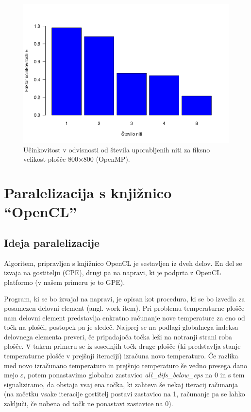 \documentclass[a4paper,titlepage,11pt]{article}
\begin{document}
\begin{figure}[H]
\begin{center}
\includegraphics[scale=0.55]{graf-rezultati-3_3.png}
\caption{Učinkovitost v odvisnosti od števila uporabljenih niti za fiksno velikost plošče 800$\times$800 (OpenMP).}
\label{graf-rezultati-ucinkovitost-3}
\end{center}
\vspace{-25pt}
\end{figure}

\pagebreak

\section{Paralelizacija s knjižnico ``OpenCL''}
\label{poglavje-opencl}

\subsection{Ideja paralelizacije}

Algoritem, pripravljen s knjižnico OpenCL je sestavljen iz dveh delov. En del se izvaja na gostitelju (CPE), drugi pa na napravi, ki je podprta z OpenCL platformo (v našem primeru je to GPE).

Program, ki se bo izvajal na napravi, je opisan kot procedura, ki se bo izvedla za posamezen delovni element (angl. work-item). Pri problemu temperaturne plošče nam delovni element predstavlja enkratno računanje nove temperature za eno od točk na plošči, postopek pa je sledeč. Najprej se na podlagi globalnega indeksa delovnega elementa preveri, če pripadajoča točka leži na notranji strani roba plošče. V takem primeru se iz sosednjih točk druge plošče (ki predstavlja stanje temperaturne plošče v prejšnji iteraciji) izračuna novo temperaturo. Če razlika med novo izračunano temperaturo in prejšnjo temperaturo še vedno presega dano mejo \(\varepsilon\), potem ponastavimo globalno zastavico \textit{all\_difs\_below\_eps} na 0 in s tem signaliziramo, da obstaja vsaj ena točka, ki zahteva še nekaj iteracij računanja (na začetku vsake iteracije gostitelj postavi zastavico na 1, računanje pa se lahko zaključi, če nobena od točk ne ponastavi zastavice na 0).
\end{document}
